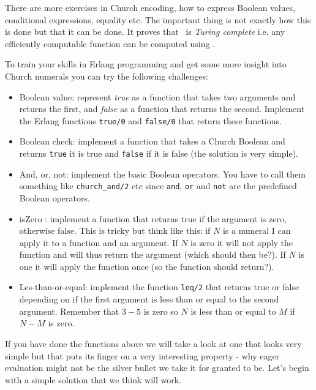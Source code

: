 \documentclass[a4paper,11pt]{article}
\begin{document}
There are more exercises in Church encoding, how to express Boolean
values, conditional expressions, equality etc. The important thing is
not exactly how this is done but that it can be done. It proves that
\lamc\ is {\em Turing complete} i.e. any efficiently computable
function can be computed using \lamc.

To train your skills in Erlang programming and get some
more insight into Church numerals you can try the following challenges:

\begin{itemize}

\item Boolean value: represent {\em true} as a function that takes two
  arguments and returns the first, and {\em false} as a function that
  returns the second.  Implement the Erlang functions {\tt true/0} and
  {\tt false/0} that return these functions.
  
\item Boolean check: implement a function that takes a Church Boolean
  and returns {\tt true} it is true and {\tt false} if it is false
  (the solution is very simple).
  
\item And, or, not: implement the basic Boolean operators. You have to
  call them something like {\tt church_and/2} etc since {\tt and},
  {\tt or} and {\tt not} are the predefined Boolean operators.

\item isZero : implement a function that returns true if the argument
  is zero, otherwise false. This is tricky but think like this: if $N$
  is a numeral I can apply it to a function and an argument. If $N$ is
  zero it will not apply the function and will thus return the
  argument (which should then be?). If $N$ is one it will apply the
  function once (so the function should return?).

\item Les-than-or-equal: implement the function {\tt leq/2} that
  returns true or false depending on if the first argument is less
  than or equal to the second argument. Remember that $3-5$ is zero so
  $N$ is less than or equal to $M$ if $N -M$ is zero.
\end{itemize}

If you have done the functions above we will take a look at one that
looks very simple but that puts its finger on a very interesting
property - why eager evaluation might not be the silver bullet we take
it for granted to be. Let's begin with a simple solution that we think will work.
\end{document}
